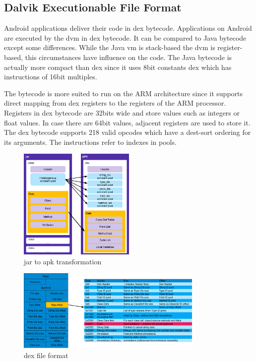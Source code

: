 \subsection{Dalvik Executionable File Format} \label{subsection:android-dex}
Android applications deliver their code in \gls{dex} bytecode.
Applications on Android are executed by the \gls{dvm} in \gls{dex} bytecode.
It can be compared to Java bytecode except some differences.
While the Java \gls{vm} is stack-based the \gls{dvm} is register-based, this circumstances have influence on the code.
The Java bytecode is actually more compact than dex since it uses 8bit constants \gls{dex} which has instructions of 16bit multiples.

The bytecode is more suited to run on the ARM architecture since it supports direct mapping from dex registers to the registers of the ARM processor.
Registers in \gls{dex} bytecode are 32bits wide and store values such as integers or float values.
In case there are 64bit values, adjacent registers are used to store it.
The \gls{dex} bytecode supports 218 valid opcodes which have a dest-sort ordering for its arguments.
The instructions refer to indexes in pools.
\begin{figure}[h]
    \centering
    \includegraphics[width=0.5\textwidth]{data/java.png}
    \caption{\gls{jar} to \gls{apk} transformation \cite{googleDalvik}}
    \label{fig:java}
\end{figure}

\begin{figure}[h]
    \centering
    \includegraphics[width=0.8\textwidth]{data/dex.png}
    \caption{\gls{dex} file format \cite{andevconDalvikART}}
    \label{fig:dex}
\end{figure}


